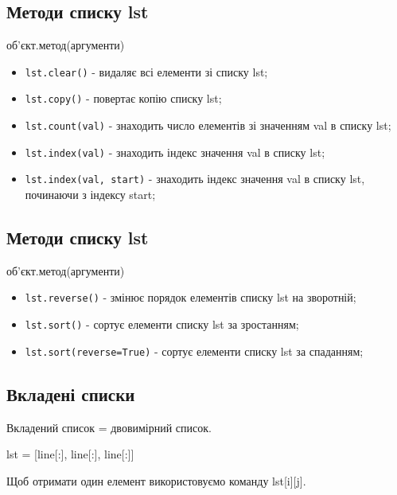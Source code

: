 \subsection{Методи списку lst} 
\begin{frame}
\begin{center}
об'єкт.метод(аргументи)
\end{center}
\begin{itemize}
        \item<1-> \texttt{lst.clear()} - видаляє всі елементи зі списку lst;
        \item<2-> \texttt{lst.copy()} - повертає копію списку lst;
        \item<3-> \texttt{lst.count(val)} - знаходить число елементів зі значенням val в списку lst;
        \item<4-> \texttt{lst.index(val)} - знаходить індекс значення val в списку lst;
        \item<4-> \texttt{lst.index(val, start)} - знаходить індекс значення val в списку lst, починаючи з індексу start;
    \end{itemize}
\end{frame}

\subsection{Методи списку lst} 
\begin{frame}
\begin{center}
об'єкт.метод(аргументи)
\end{center}
\begin{itemize}
        \item<1-> \texttt{lst.reverse()} - змінює порядок елементів списку lst на зворотній;
        \item<2-> \texttt{lst.sort()} - сортує елементи списку lst за зростанням;
        \item<2-> \texttt{lst.sort(reverse=True)} - сортує елементи списку lst за спаданням;
    \end{itemize}
\end{frame}

\subsection{Вкладені списки} 
\begin{frame}
\begin{center}
Вкладений список = двовимірний список.

lst = [line[:], line[:], line[:]]

Щоб отримати один елемент використовуємо команду lst[i][j]. 
\end{center}

\end{frame}


